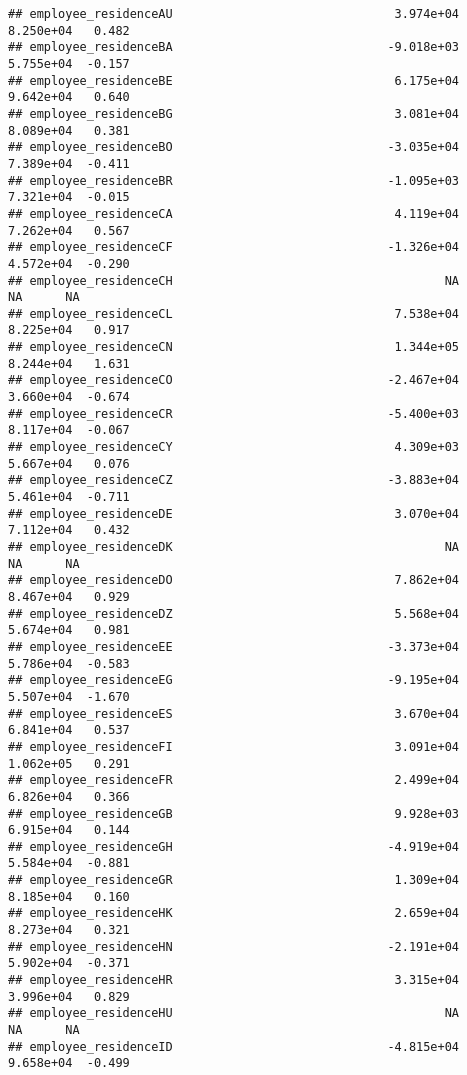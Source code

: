 \documentclass[
]{article}
\begin{document}
\begin{verbatim}
## employee_residenceAU                               3.974e+04  8.250e+04   0.482
## employee_residenceBA                              -9.018e+03  5.755e+04  -0.157
## employee_residenceBE                               6.175e+04  9.642e+04   0.640
## employee_residenceBG                               3.081e+04  8.089e+04   0.381
## employee_residenceBO                              -3.035e+04  7.389e+04  -0.411
## employee_residenceBR                              -1.095e+03  7.321e+04  -0.015
## employee_residenceCA                               4.119e+04  7.262e+04   0.567
## employee_residenceCF                              -1.326e+04  4.572e+04  -0.290
## employee_residenceCH                                      NA         NA      NA
## employee_residenceCL                               7.538e+04  8.225e+04   0.917
## employee_residenceCN                               1.344e+05  8.244e+04   1.631
## employee_residenceCO                              -2.467e+04  3.660e+04  -0.674
## employee_residenceCR                              -5.400e+03  8.117e+04  -0.067
## employee_residenceCY                               4.309e+03  5.667e+04   0.076
## employee_residenceCZ                              -3.883e+04  5.461e+04  -0.711
## employee_residenceDE                               3.070e+04  7.112e+04   0.432
## employee_residenceDK                                      NA         NA      NA
## employee_residenceDO                               7.862e+04  8.467e+04   0.929
## employee_residenceDZ                               5.568e+04  5.674e+04   0.981
## employee_residenceEE                              -3.373e+04  5.786e+04  -0.583
## employee_residenceEG                              -9.195e+04  5.507e+04  -1.670
## employee_residenceES                               3.670e+04  6.841e+04   0.537
## employee_residenceFI                               3.091e+04  1.062e+05   0.291
## employee_residenceFR                               2.499e+04  6.826e+04   0.366
## employee_residenceGB                               9.928e+03  6.915e+04   0.144
## employee_residenceGH                              -4.919e+04  5.584e+04  -0.881
## employee_residenceGR                               1.309e+04  8.185e+04   0.160
## employee_residenceHK                               2.659e+04  8.273e+04   0.321
## employee_residenceHN                              -2.191e+04  5.902e+04  -0.371
## employee_residenceHR                               3.315e+04  3.996e+04   0.829
## employee_residenceHU                                      NA         NA      NA
## employee_residenceID                              -4.815e+04  9.658e+04  -0.499

\end{verbatim}
\end{document}
